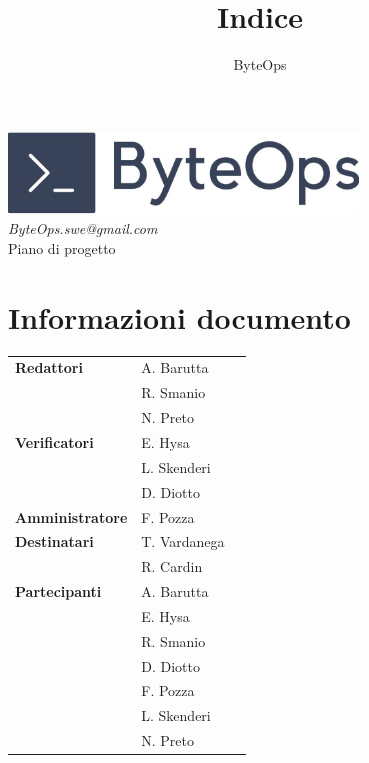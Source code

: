 \documentclass{article}
\title{\textbf{\fontsize{30}{6}\selectfont Indice}}
\author{\fontsize{14}{6}\selectfont ByteOps}
\date{}
\begin{document}
\pagestyle{fancy}
\begin{center}
    \includegraphics[width = 0.7\textwidth]{../Images/logo.png} \\
    \vspace{0.2cm}
    \textcolor[RGB]{60, 60, 60}{\textit{ByteOps.swe@gmail.com}} \\
    \vspace{1cm}
    \fontsize{16}{6}\selectfont Piano di progetto \\
    \vspace{0.5cm}
\end{center}

\section*{Informazioni documento}
\def\arraystretch{1.2}
\begin{tabular}{>{\raggedleft\arraybackslash}p{}|>{\raggedright\arraybackslash}p{}c}
    \hline
    \addlinespace
    \textbf{Redattori}      & A. Barutta             \\ & R. Smanio \\ & N. Preto \vspace{10pt} \\
    \textbf{Verificatori}   & E. Hysa                \\ & L. Skenderi \\ & D. Diotto \vspace{10pt} \\
    \textbf{Amministratore} & F. Pozza \vspace{10pt} \\
    \textbf{Destinatari}    & T. Vardanega           \\ & R. Cardin \vspace{10pt} \\
    \textbf{Partecipanti}   & A. Barutta             \\ & E. Hysa \\ & R. Smanio \\ & D. Diotto \\ & F. Pozza \\ & L. Skenderi \\ & N. Preto \vspace{10pt} \\
\end{tabular}
\pagebreak
\end{document}

